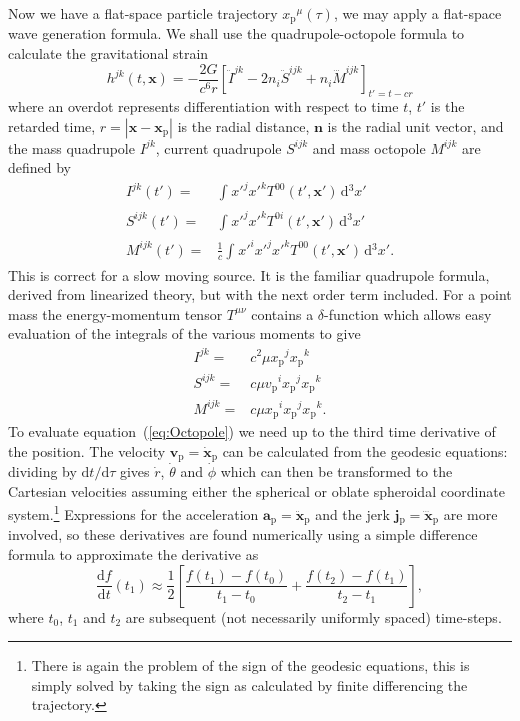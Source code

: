 \documentclass[a4paper, 11pt, titlepage, twoside]{report}
\newcommand{\eqnref}[1]{equation~(\ref{eq:#1})}
\newcommand{\sub}[1]{\ensuremath{_\mathrm{#1}}}
\newcommand{\recip}[1]{\ensuremath{\frac{1}{#1}}}
\newcommand{\dd}{\ensuremath{\mathrm{d}}}
\newcommand{\diff}[2]{\ensuremath{\frac{\dd {#1}}{\dd {#2}}}}
\newcommand{\linediff}[2]{\ensuremath{\dd {#1}/\dd {#2}}}
\newcommand{\intd}[4]{\ensuremath{\int_{#1}^{#2}{#3}\,\dd{#4}}}
\begin{document}
Now we have a flat-space particle trajectory ${x\sub{p}}^\mu(\tau)$, we may apply a flat-space wave generation formula. We shall use the quadrupole-octopole formula to calculate the gravitational strain\cite{Press1977, Bekenstein1973}
\begin{equation}
h^{jk}(t, \boldsymbol{x}) = -\frac{2G}{c^6r}\left[\ddot{I}^{jk} - 2n_i\ddot{S}^{ijk} + n_i\dddot{M}^{ijk}\right]_{t' = t - cr}
\label{eq:Octopole}
\end{equation}
where an overdot represents differentiation with respect to time $t$, $t'$ is the retarded time, $r = \left|\boldsymbol{x} - \boldsymbol{x}\sub{p}\right|$ is the radial distance, $\boldsymbol{n}$ is the radial unit vector, and the mass quadrupole ${I}^{jk}$, current quadrupole ${S}^{ijk}$ and mass octopole ${M}^{ijk}$ are defined by
\begin{align}
{I}^{jk}(t') = {} & \intd{}{}{{x'}^j{x'}^kT^{00}(t', \boldsymbol{x'})}{^3x'}\\
{S}^{ijk}(t') = {} & \intd{}{}{{x'}^j{x'}^kT^{0i}(t', \boldsymbol{x'})}{^3x'}\\
{M}^{ijk}(t') = {} & \recip{c}\intd{}{}{{x'}^i{x'}^j{x'}^kT^{00}(t', \boldsymbol{x'})}{^3x'}.
\end{align}
This is correct for a slow moving source. It is the familiar quadrupole formula\cite{Misner1973, Hobson2006}, derived from linearized theory, but with the next order term included. For a point mass the energy-momentum tensor $T^{\mu\nu}$ contains a $\delta$-function which allows easy evaluation of the integrals of the various moments to give
\begin{align}
{I}^{jk} = {} & c^2\mu x\sub{p}^jx\sub{p}^k\\
{S}^{ijk} = {} & c\mu v\sub{p}^ix\sub{p}^jx\sub{p}^k\\
{M}^{ijk} = {} & c\mu x\sub{p}^ix\sub{p}^jx\sub{p}^k.
\end{align}
To evaluate \eqnref{Octopole} we need up to the third time derivative of the position. The velocity $\boldsymbol{v}\sub{p} = \dot{\boldsymbol{x}}\sub{p}$ can be calculated from the geodesic equations: dividing by $\linediff{t}{\tau}$ gives $\dot{r}$, $\dot{\theta}$ and $\dot{\phi}$ which can then be transformed to the Cartesian velocities assuming either the spherical or oblate spheroidal coordinate system.\footnote{There is again the problem of the sign of the geodesic equations, this is simply solved by taking the sign as calculated by finite differencing the trajectory.} Expressions for the acceleration $\boldsymbol{a}\sub{p} = \ddot{\boldsymbol{x}}\sub{p}$ and the jerk $\boldsymbol{j}\sub{p} = \dddot{\boldsymbol{x}}\sub{p}$ are more involved, so these derivatives are found numerically using a simple difference formula to approximate the derivative as
\begin{equation}
\diff{f}{t}(t_1) \approx \recip{2}\left[\frac{f(t_1) - f(t_0)}{t_1 - t_0} + \frac{f(t_2) - f(t_1)}{t_2 - t_1}\right],
\end{equation}
where $t_0$, $t_1$ and $t_2$ are subsequent (not necessarily uniformly spaced) time-steps.
\end{document}
